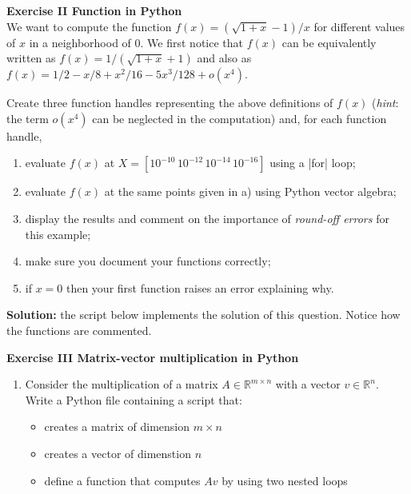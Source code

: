 \documentclass[11pt]{article}
\begin{document}

\bigskip


\bigskip

{\bf{Exercise II Function in Python}}\\

We want to compute the function $f(x) = (\sqrt{1+x}-1)/x$ for different values of $x$ in a neighborhood of 0. We first notice that $f(x)$ can be equivalently written as $f(x) = 1/(\sqrt{1+x}+1)$ and also as $f(x)=1/2 - x/8 + x^2/16 - 5x^3/128 + o(x^4)$.

Create three function handles representing the above definitions of $f(x)$ (\textit{hint}: the term $o(x^4)$ can be neglected in the computation) and, for each function handle,
\begin{enumerate}
\item evaluate $f(x)$ at $X = [10^{-10} \, 10^{-12} \, 10^{-14} \, 10^{-16}]$ using a |for| loop;
\item evaluate $f(x)$ at the same points given in a) using Python vector algebra;
\item display the results and comment on the importance of \textit{round-off errors} for this example;
\item make sure you document your functions correctly;
\item if $x=0$ then your first function raises an error explaining why.
\end{enumerate}

\textbf{Solution: } the script below implements the solution of this question. Notice how the functions are commented.


\bigskip

\bigskip

{\bf{Exercise III Matrix-vector multiplication in Python}}\\
\begin{enumerate}
\item Consider the multiplication of a matrix $A \in \mathbb{R}^{m \times n}$ with a vector $v \in \mathbb{R}^n$.  Write a Python file containing a script that:
\begin{itemize}
\item creates a matrix of dimension $m \times n$
\item creates a vector of dimenstion $n$
\item define a function that computes $A v$ by using two nested loops
\end{itemize}
\end{enumerate}
\end{document}
